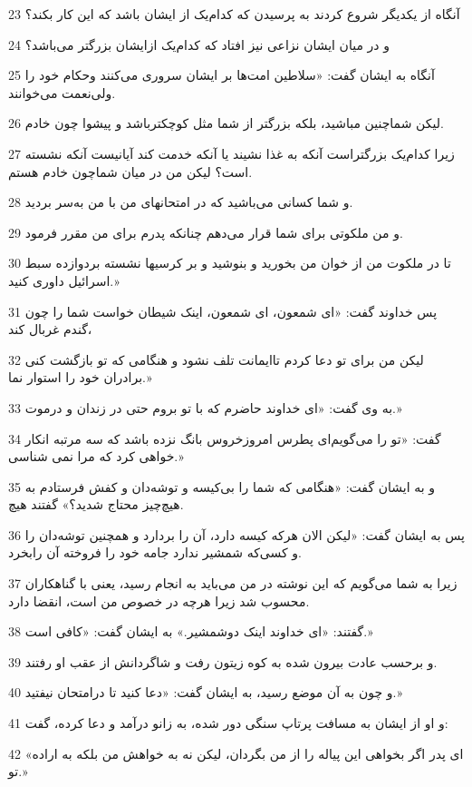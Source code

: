 \par 23 آنگاه از یکدیگر شروع کردند به پرسیدن که کدام‌یک از ایشان باشد که این کار بکند؟
\par 24 و در میان ایشان نزاعی نیز افتاد که کدام‌یک ازایشان بزرگتر می‌باشد؟
\par 25 آنگاه به ایشان گفت: «سلاطین امت‌ها بر ایشان سروری می‌کنند وحکام خود را ولی‌نعمت می‌خوانند.
\par 26 لیکن شماچنین مباشید، بلکه بزرگتر از شما مثل کوچکترباشد و پیشوا چون خادم.
\par 27 زیرا کدام‌یک بزرگتراست آنکه به غذا نشیند یا آنکه خدمت کند آیانیست آنکه نشسته است؟ لیکن من در میان شماچون خادم هستم.
\par 28 و شما کسانی می‌باشید که در امتحانهای من با من به‌سر بردید.
\par 29 و من ملکوتی برای شما قرار می‌دهم چنانکه پدرم برای من مقرر فرمود.
\par 30 تا در ملکوت من از خوان من بخورید و بنوشید و بر کرسیها نشسته بردوازده سبط اسرائیل داوری کنید.»
\par 31 پس خداوند گفت: «ای شمعون، ای شمعون، اینک شیطان خواست شما را چون گندم غربال کند،
\par 32 لیکن من برای تو دعا کردم تاایمانت تلف نشود و هنگامی که تو بازگشت کنی برادران خود را استوار نما.»
\par 33 به وی گفت: «ای خداوند حاضرم که با تو بروم حتی در زندان و درموت.»
\par 34 گفت: «تو را می‌گویم‌ای پطرس امروزخروس بانگ نزده باشد که سه مرتبه انکار خواهی کرد که مرا نمی شناسی.»
\par 35 و به ایشان گفت: «هنگامی که شما را بی‌کیسه و توشه‌دان و کفش فرستادم به هیچ‌چیز محتاج شدید؟» گفتند هیچ.
\par 36 پس به ایشان گفت: «لیکن الان هر‌که کیسه دارد، آن را بردارد و همچنین توشه‌دان را و کسی‌که شمشیر ندارد جامه خود را فروخته آن رابخرد.
\par 37 زیرا به شما می‌گویم که این نوشته در من می‌باید به انجام رسید، یعنی با گناهکاران محسوب شد زیرا هر‌چه در خصوص من است، انقضا دارد.
\par 38 گفتند: «ای خداوند اینک دوشمشیر.» به ایشان گفت: «کافی است.»
\par 39 و برحسب عادت بیرون شده به کوه زیتون رفت و شاگردانش از عقب او رفتند.
\par 40 و چون به آن موضع رسید، به ایشان گفت: «دعا کنید تا درامتحان نیفتید.»
\par 41 و او از ایشان به مسافت پرتاپ سنگی دور شده، به زانو درآمد و دعا کرده، گفت:
\par 42 «ای پدر اگر بخواهی این پیاله را از من بگردان، لیکن نه به خواهش من بلکه به اراده تو.»
